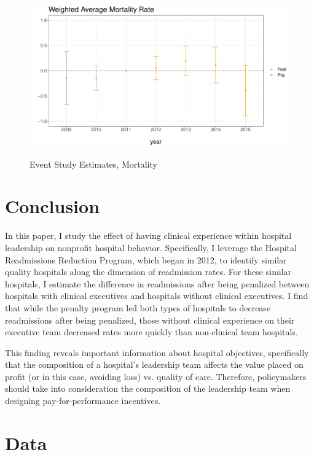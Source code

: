 \documentclass[12pt]{article}
\begin{document}
    \begin{figure}[ht!]
        \caption{Event Study Estimates, Mortality}
        \includegraphics[scale=.5]{Objects/mort_es_graph.pdf}
        \label{fig:wa_eventstudy_mort}
    \end{figure}

    \section{Conclusion}

    In this paper, I study the effect of having clinical experience within hospital leadership on nonprofit hospital behavior. Specifically, I leverage the Hospital Readmissions Reduction Program, which began in 2012, to identify similar quality hospitals along the dimension of readmission rates. For these similar hospitals, I estimate the difference in readmissions after being penalized between hospitals with clinical executives and hospitals without clinical executives. I find that while the penalty program led both types of hospitals to decrease readmissions after being penalized, those without clinical experience on their executive team decreased rates more quickly than non-clinical team hospitals. 

    This finding reveals important information about hospital objectives, specifically that the composition of a hospital's leadership team affects the value placed on profit (or in this case, avoiding loss) vs. quality of care. Therefore, policymakers should take into consideration the composition of the leadership team when designing pay-for-performance incentives.

	
	\newpage

    \printbibliography

\appendix

 \section{Data}\label{appendixdata}
\end{document}

